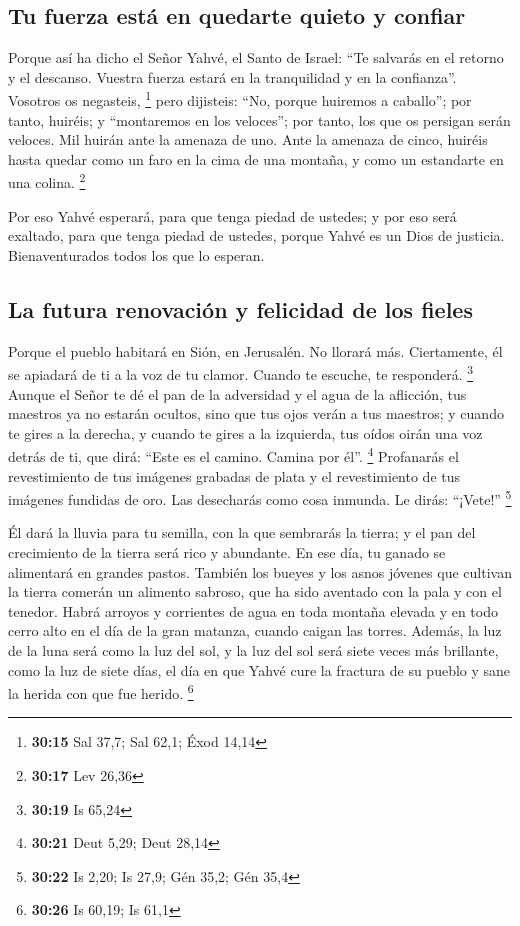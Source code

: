 \hypertarget{tu-fuerza-estuxe1-en-quedarte-quieto-y-confiar}{%
\subsection{Tu fuerza está en quedarte quieto y
confiar}\label{tu-fuerza-estuxe1-en-quedarte-quieto-y-confiar}}

 Porque así ha dicho el Señor Yahvé, el Santo de Israel:
``Te salvarás en el retorno y el descanso. Vuestra fuerza estará en la
tranquilidad y en la confianza''. Vosotros os negasteis, \footnote{\textbf{30:15}
  Sal 37,7; Sal 62,1; Éxod 14,14}  pero dijisteis: ``No,
porque huiremos a caballo''; por tanto, huiréis; y ``montaremos en los
veloces''; por tanto, los que os persigan serán veloces. 
Mil huirán ante la amenaza de uno. Ante la amenaza de cinco, huiréis
hasta quedar como un faro en la cima de una montaña, y como un
estandarte en una colina. \footnote{\textbf{30:17} Lev 26,36}

 Por eso Yahvé esperará, para que tenga piedad de
ustedes; y por eso será exaltado, para que tenga piedad de ustedes,
porque Yahvé es un Dios de justicia. Bienaventurados todos los que lo
esperan.

\hypertarget{la-futura-renovaciuxf3n-y-felicidad-de-los-fieles}{%
\subsection{La futura renovación y felicidad de los
fieles}\label{la-futura-renovaciuxf3n-y-felicidad-de-los-fieles}}

 Porque el pueblo habitará en Sión, en Jerusalén. No
llorará más. Ciertamente, él se apiadará de ti a la voz de tu clamor.
Cuando te escuche, te responderá. \footnote{\textbf{30:19} Is 65,24}
 Aunque el Señor te dé el pan de la adversidad y el agua
de la aflicción, tus maestros ya no estarán ocultos, sino que tus ojos
verán a tus maestros;  y cuando te gires a la derecha, y
cuando te gires a la izquierda, tus oídos oirán una voz detrás de ti,
que dirá: ``Este es el camino. Camina por él''. \footnote{\textbf{30:21}
  Deut 5,29; Deut 28,14}  Profanarás el revestimiento de
tus imágenes grabadas de plata y el revestimiento de tus imágenes
fundidas de oro. Las desecharás como cosa inmunda. Le dirás: ``¡Vete!''
\footnote{\textbf{30:22} Is 2,20; Is 27,9; Gén 35,2; Gén 35,4}

 Él dará la lluvia para tu semilla, con la que sembrarás
la tierra; y el pan del crecimiento de la tierra será rico y abundante.
En ese día, tu ganado se alimentará en grandes pastos. 
También los bueyes y los asnos jóvenes que cultivan la tierra comerán un
alimento sabroso, que ha sido aventado con la pala y con el tenedor.
 Habrá arroyos y corrientes de agua en toda montaña
elevada y en todo cerro alto en el día de la gran matanza, cuando caigan
las torres.  Además, la luz de la luna será como la luz
del sol, y la luz del sol será siete veces más brillante, como la luz de
siete días, el día en que Yahvé cure la fractura de su pueblo y sane la
herida con que fue herido. \footnote{\textbf{30:26} Is 60,19; Is 61,1}

